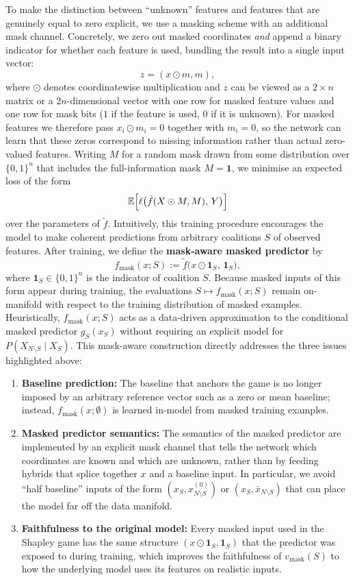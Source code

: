 \documentclass{article}
\begin{document}
To make the distinction between ``unknown'' features and features that are genuinely equal to zero explicit, we use a masking scheme with an additional mask channel.
Concretely, we zero out masked coordinates \emph{and} append a binary indicator for whether each feature is used, bundling the result into a single input vector:
\[
z = (x \odot m, m),
\]
where $\odot$ denotes coordinatewise multiplication and $z$ can be viewed as a $2 \times n$ matrix or a $2n$-dimensional vector with one row for masked feature values and one row for mask bits ($1$ if the feature is used, $0$ if it is unknown).
For masked features we therefore pass $x_i \odot m_i = 0$ together with $m_i = 0$, so the network can learn that these zeros correspond to missing information rather than actual zero-valued features.
Writing $M$ for a random mask drawn from some distribution over $\{0,1\}^n$ that includes the full-information mask $M = \mathbf{1}$, we minimise an expected loss of the form
\[
\mathbb{E}\Bigl[ \ell\bigl(\tilde f(X \odot M, M),\, Y\bigr) \Bigr]
\]
over the parameters of $\tilde f$.
Intuitively, this training procedure encourages the model to make coherent predictions from arbitrary coalitions $S$ of observed features.
After training, we define the \textbf{mask-aware masked predictor} by
\[
f_{\text{mask}}(x; S)
:= \tilde f\bigl(x \odot \mathbf{1}_S,\, \mathbf{1}_S\bigr),
\]
where $\mathbf{1}_S \in \{0,1\}^n$ is the indicator of coalition $S$.
Because masked inputs of this form appear during training, the evaluations $S \mapsto f_{\text{mask}}(x; S)$ remain on-manifold with respect to the training distribution of masked examples.
Heuristically, $f_{\text{mask}}(x; S)$ acts as a data-driven approximation to the conditional masked predictor $g_S(x_S)$ without requiring an explicit model for $P(X_{N \setminus S} \mid X_S)$.
This mask-aware construction directly addresses the three issues highlighted above:
\begin{enumerate}
  \item \textbf{Baseline prediction:} The baseline that anchors the game is no longer imposed by an arbitrary reference vector such as a zero or mean baseline; instead, $f_{\text{mask}}(x; \emptyset)$ is learned in-model from masked training examples.
  \item \textbf{Masked predictor semantics:} The semantics of the masked predictor are implemented by an explicit mask channel that tells the network which coordinates are known and which are unknown, rather than by feeding hybrids that splice together $x$ and a baseline input.
  In particular, we avoid ``half baseline'' inputs of the form $(x_S, x^{(0)}_{N \setminus S})$ or $(x_S, \bar{x}_{N \setminus S})$ that can place the model far off the data manifold.
  \item \textbf{Faithfulness to the original model:} Every masked input used in the Shapley game has the same structure $(x \odot \mathbf{1}_S, \mathbf{1}_S)$ that the predictor was exposed to during training, which improves the faithfulness of $v_{\text{mask}}(S)$ to how the underlying model uses its features on realistic inputs.
\end{enumerate}
\end{document}
